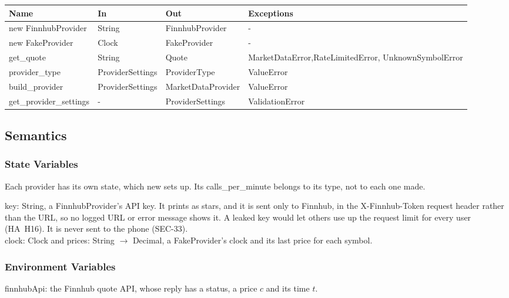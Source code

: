 \documentclass[12pt, titlepage]{article}
\begin{document}
\begin{center}
\begin{tabular}{>{\raggedright\arraybackslash}p{3.95cm} p{3.05cm} p{3.75cm} p{4.05cm}}
\toprule
\textbf{Name} & \textbf{In} & \textbf{Out} & \textbf{Exceptions} \\
\midrule
new FinnhubProvider & String & FinnhubProvider & - \\
new FakeProvider & Clock & FakeProvider & - \\
get\_quote & String & Quote & MarketDataError,\newline RateLimitedError,\newline
UnknownSymbolError \\
provider\_type & ProviderSettings & ProviderType & ValueError \\
build\_provider & ProviderSettings & MarketDataProvider & ValueError \\
get\_provider\_settings & - & ProviderSettings & ValidationError \\
\bottomrule
\end{tabular}
\end{center}

\subsection{Semantics}

\subsubsection{State Variables}

\noindent Each provider has its own state, which new sets up. Its
calls\_per\_minute belongs to its type, not to each one made.

\medskip
\noindent key: String, a FinnhubProvider's API key. It prints as stars, and it
is sent only to Finnhub, in the X-Finnhub-Token request header rather than the
URL, so no logged URL or error message shows it. A leaked key would let others
use up the request limit for every user (HA~H16). It is never sent to the
phone (SEC-33).\\
clock: Clock and prices: String $\rightarrow$ Decimal, a FakeProvider's clock
and its last price for each symbol.

\subsubsection{Environment Variables}

\noindent finnhubApi: the Finnhub quote API, whose reply has a status, a price
$c$ and its time $t$.
\end{document}
